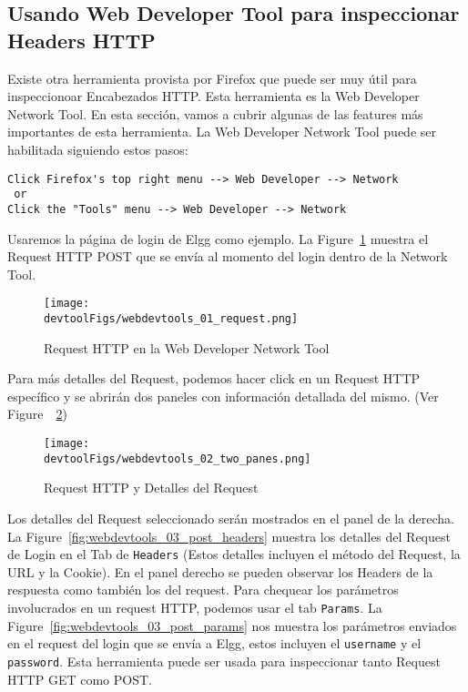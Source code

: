 \subsection{Usando Web Developer Tool para inspeccionar Headers HTTP}
\label{web:sec:web_dev_tools}

Existe otra herramienta provista por Firefox que puede ser muy útil para inspeccionoar Encabezados HTTP.
Esta herramienta es la Web Developer Network Tool. En esta sección, vamos a cubrir algunas de las features más importantes de esta herramienta.
La Web Developer Network Tool puede ser habilitada siguiendo estos pasos:

\begin{lstlisting}
Click Firefox's top right menu --> Web Developer --> Network
 or 
Click the "Tools" menu --> Web Developer --> Network 
\end{lstlisting}

Usaremos la página de login de Elgg como ejemplo.
La Figure~\ref{fig:webdevtools_01_request} muestra el Request HTTP POST que se envía al momento del login dentro de la Network Tool.

\begin{figure}[htb]
\begin{center}
\texttt{[image: \\devtoolFigs/webdevtools\_01\_request.png]}
\end{center}
\caption{Request HTTP en la Web Developer Network Tool}
\label{fig:webdevtools_01_request}
\end{figure}

Para más detalles del Request, podemos hacer click en un Request HTTP específico y se abrirán dos paneles con información detallada del mismo. (Ver Figure~\ \ref{fig:webdevtools_02_two_panes})

\begin{figure}[htb]
\begin{center}
	\texttt{[image: \\devtoolFigs/webdevtools\_02\_two\_panes.png]}
\end{center}
\caption{Request HTTP y Detalles del Request}
\label{fig:webdevtools_02_two_panes}
\end{figure}


Los detalles del Request seleccionado serán mostrados en el panel de la derecha.
La Figure~\ref{fig:webdevtools_03_post_headers} muestra los detalles del Request de Login en el Tab de 
\texttt{Headers} (Estos detalles incluyen el método del Request, la URL y la Cookie). En el panel derecho se pueden observar los Headers de la respuesta como también los del request.
Para chequear los parámetros involucrados en un request HTTP, podemos usar el tab \texttt{Params}. La Figure~\ref{fig:webdevtools_03_post_params} nos muestra los parámetros enviados en el request del login que se envía a Elgg, estos incluyen el \texttt{username} y el \texttt{password}. Esta herramienta puede ser usada para inspeccionar tanto Request HTTP GET como POST.

